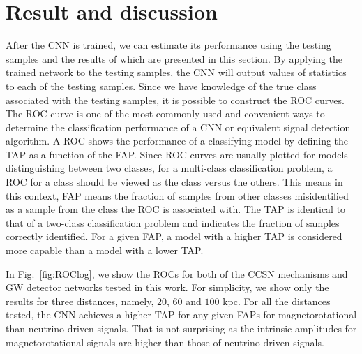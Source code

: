 \documentclass[aps,twocolumn,showpacs,groupedaddress, nofootinbib]{revtex4}  %
\begin{document}
\section{Result and discussion}\label{sec:result}
%
%
After the \ac{CNN} is trained, we can estimate its performance using the
testing samples and the results of which are presented in this section. 
By applying the trained network to the testing samples, 
the \ac{CNN} will output values of statistics to each of the testing samples. 
Since we have knowledge of the true class associated with the testing samples,
it is possible to construct the \ac{ROC} curves.
The \ac{ROC} curve is one of the most commonly used and convenient ways to 
determine the classification performance of a \ac{CNN} or equivalent signal detection 
algorithm. A \ac{ROC} shows the performance of a classifying model by
defining the \ac{TAP} as a function of the \ac{FAP}. Since \ac{ROC} curves are
usually plotted for models distinguishing between two classes, for a
multi-class classification problem, a \ac{ROC} for a class should be viewed as
the class versus the others. This means in this context, \ac{FAP} means the
fraction of samples from other classes misidentified as a sample from the class
the \ac{ROC} is associated with. The \ac{TAP} is identical to that of a
two-class classification problem and indicates the fraction of samples
correctly identified.  For a given \ac{FAP}, a model with a higher \ac{TAP} is
considered more capable than a model with a lower \ac{TAP}.

%
%
In Fig.~\ref{fig:ROClog}, we show the \acp{ROC} for both of the \ac{CCSN}
mechanisms and \ac{GW} detector networks tested in this work. For simplicity,
we show only the results for three distances, namely, $20$, $60$ and $100$ kpc.
For all the distances tested, the \ac{CNN} achieves a higher \ac{TAP} for any
given \acp{FAP} for magnetorotational than neutrino-driven signals.  That is
not surprising as the intrinsic amplitudes for magnetorotational signals are
higher than those of neutrino-driven signals.
\end{document}
